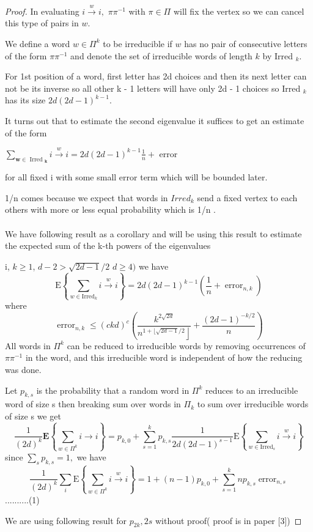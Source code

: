 \documentclass[oneside]{book}
\begin{document}
\begin{proof}
 In evaluating $i \stackrel{w}{\rightarrow} i,$  $\pi \pi^{-1}$ with $\pi \in \Pi $    will fix the vertex so we can cancel this type of pairs in  $w$.\par
 We define a word $w \in \Pi^{k}$ to be irreducible if $w$ has no pair of consecutive letters of the form $\pi \pi^{-1}$ and denote the set of irreducible words of length $k$ by Irred $_{k} .$\par
 For 1st position of a word, first letter has  2d choices and then its next letter can not be its inverse so all other k - 1 letters will have only 2d - 1 choices so
  Irred $_{k}$ has its  size $2 d(2 d-1)^{k-1} .$ \par 
  It turns out that to estimate the second eigenvalue it suffices
to get an estimate of the form
\begin{center}
   $\sum_{\boldsymbol{w} \in \text { Irred }_{\boldsymbol{k}}} i \stackrel{w}{\rightarrow} i=2 d(2 d-1)^{k-1} \frac{1}{n}+$ error 
\end{center}
for all fixed i with some small error term which will be bounded later.\par
 1/n comes because we expect  that words in $Irred_{k} $ send a fixed vertex to each  others with more or less equal probability which is 1/n . \\\\
We have following result as a corollary and will be using this result to estimate the expected sum of the k-th powers of the eigenvalues \par

  i, $k \geq 1$,  $d-2>\sqrt{2 d-1} / 2$  $d \geq 4)$ we have
$$
\mathrm{E}\left\{\sum_{w \in \mathrm{Irred}_{k}} i \stackrel{w}{\rightarrow} i\right\}=2 d(2 d-1)^{k-1}\left(\frac{1}{n}+\operatorname{error}_{n, k}\right)
$$
where
$$
\operatorname{error}_{n, k} \leq(c k d)^{c}\left(\frac{k^{2 \sqrt{2 d}}}{\left.n^{1+\lfloor\sqrt{2 d-1} / 2}\right\rfloor}+\frac{(2 d-1)^{-k / 2}}{n}\right)
$$
All words in $\Pi^{k}$ can be reduced to irreducible words by removing occurrences of $\pi \pi^{-1}$ in the word, and this irreducible word is independent of how the reducing was done. \par 
Let  $p_{k,s}$ is the probability that a random word in  $\Pi^{k}$ reduces to an irreducible word of size s then breaking sum over words in  $\Pi_k$ to sum over irreducible words of size s  we get  
$$
\frac{1}{(2 d)^{k}} \mathbf{E}\left\{\sum_{w \in \Pi^{k}} i\rightarrow i\right\}=p_{k, 0}+\sum_{s=1}^{k} p_{k, s} \frac{1}{2 d(2 d-1)^{s-1}} \mathrm{E}\left\{\sum_{w \in \mathrm{Irred}_{s}} i \stackrel{w}{\rightarrow} i\right\}
$$
  since $\sum_{s} p_{k, s}=1,$ we have
$$ 
\frac{1}{(2 d)^{k}} \sum_{i} \mathrm{E}\left\{\sum_{w \in \Pi^{k}} i \stackrel{w}{\rightarrow} i\right\}=1+(n-1) p_{k, 0}+\sum_{s=1}^{k} n p_{k, s} \operatorname{error}_{n, s} 
$$    ..........(1)\par
We are using following result for $p_{2k},{2s}$ without proof( proof is in paper [3])  \par


\end{proof}
\end{document}
